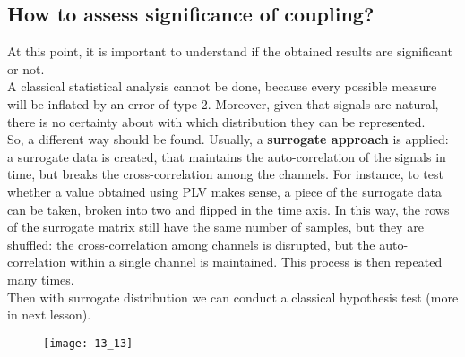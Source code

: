 \subsection{How to assess significance of coupling?}
At this point, it is important to understand if the obtained results are significant or not.\\
A classical statistical analysis cannot be done, because every possible measure will be inflated by an error of type 2. Moreover, given that signals are natural, there is no certainty about with which distribution they can be represented.\\
So, a different way should be found. Usually, a \textbf{surrogate approach} is applied: a surrogate data is created, that maintains the auto-correlation of the signals in time, but breaks the cross-correlation among the channels. For instance, to test whether a value obtained using PLV makes sense, a piece of the surrogate data can be taken, broken into two and flipped in the time axis. In this way, the rows of the surrogate matrix still have the same number of samples, but they are shuffled: the cross-correlation among channels is disrupted, but the auto-correlation within a single channel is maintained. This process is then repeated many times.\\
Then with surrogate distribution we can conduct a classical hypothesis test (more in next lesson).
\begin{figure}[H]
    \centering
    \texttt{[image: 13\_13]}
\end{figure}






 